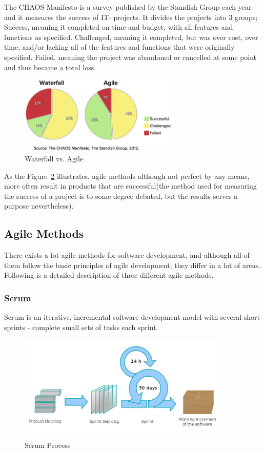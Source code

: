 The CHAOS Manifesto is a survey published by the Standish Group each year and it measures the success of IT- projects. It divides the projects into 3 groups; Success, meaning it completed on time and budget, with all features and functions as specified. Challenged, meaning it  completed, but was over cost, over time, and/or lacking all of the features and functions that were originally specified. Failed, meaning the project was abandoned or cancelled at some point and thus became a total loss.

\begin{figure}
\centering
\includegraphics[width=3in]{image/Agile-Waterfall.jpeg}
\caption{Waterfall vs. Agile}
\label{figure:devchart}
\end{figure}

As the Figure~\ref{figure:devchart} illustrates, agile methods although not perfect by any means, more often result in products that are successful(the method used for measuring the success of a project is to some degree debated, but the results serves a purpose nevertheless).

\subsection{Agile Methods}
There exists a lot agile methods for software development, and although all of them follow the basic principles of agile development, they differ in a lot of areas. Following is a detailed description of three different agile methods.

\subsubsection{Scrum}
Scrum is an iterative, incremental software development model with several short sprints - complete small sets of tasks each sprint.

\begin{figure}
\centering
\includegraphics[width=4in]{image/Scrum_process.png}
\caption{Scrum Process}
\label{figure:devchart}
\end{figure}


